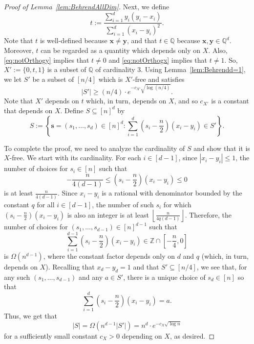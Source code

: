 \documentclass[12pt]{article}
\numberwithin{equation}{section}
\theoremstyle{definition}
\theoremstyle{remark}
\renewcommand{\vec}{\boldsymbol}
\begin{document}
\begin{proof}[Proof of Lemma~\ref{lem:BehrendAllDim}]
Next, we define
\[t:=\frac{\sum_{i=1}^dy_i(y_i-x_i)}{\sum_{i=1}^d(x_i-y_i)^2}.\]
Note that $t$ is well-defined because $\vec{x}\neq\vec{y}$, and that $t\in\mathbb{Q}$ because $\vec{x},\vec{y}\in\mathbb{Q}^d$. Moreover, $t$ can be regarded as a quantity which depends only on $X$. Also, \eqref{eq:notOrthogy} implies that $t\neq 0$ and \eqref{eq:notOrthogx} implies that $t\neq 1$. So, $X':=\{0,t,1\}$ is a subset of $\mathbb{Q}$ of cardinality 3. Using Lemma~\ref{lem:Behrendd=1}, we let $S'$ be a subset of $[n/4]$ which is $X'$-free and satisfies
\[|S'|\geq (n/4)\cdot e^{-c_{X'}\sqrt{\log(n/4)}}.\]
Note that $X'$ depends on $t$ which, in turn, depends on $X$, and so $c_{X'}$ is a constant that depends on $X$. Define $S\subseteq [n]^d$ by
\[S:=\left\{\vec{s}=(s_1,\dots,s_d)\in [n]^d:\sum_{i=1}^d \left(s_i-\frac{n}{2}\right)(x_i-y_i)\in S'\right\}.\]

To complete the proof, we need to analyze the cardinality of $S$ and show that it is $X$-free. We start with its cardinality. For each $i\in[d-1]$, since $|x_i-y_i|\leq 1$, the number of choices for $s_i\in [n]$ such that
\[-\frac{n}{4(d-1)}\leq \left(s_i-\frac{n}{2}\right)(x_i-y_i)\leq 0\]
is at least $\frac{n}{4(d-1)}$. Since $x_i-y_i$ is a rational with denominator bounded by the constant $q$ for all $i\in [d-1]$, the number of such $s_i$ for which $\left(s_i-\frac{n}{2}\right)(x_i-y_i)$ is also an integer is at least $\left\lfloor \frac{n}{4q(d-1)} \right\rfloor$. Therefore, the number of choices for $(s_1,\dots,s_{d-1})\in [n]^{d-1}$ such that 
\[\sum_{i=1}^{d-1}\left(s_i-\frac{n}{2}\right)(x_i-y_i)\in \mathbb{Z}\cap \left[ -\frac{n}{4}, 0 \right] \]
is $\Omega(n^{d-1})$, where the constant factor depends only on $d$ and $q$ (which, in turn, depends on $X$). Recalling that $x_d-y_d=1$ and that $S'\subseteq [n/4]$, we see that, for any such $(s_1,\dots,s_{d-1})$ and any $a\in S'$, there is a unique choice of $s_d\in [n]$ so that 
\[\sum_{i=1}^d \left(s_i-\frac{n}{2}\right)(x_i-y_i)=a.\]
Thus, we get that
\[|S|=\Omega(n^{d-1}|S'|) =n^d\cdot e^{-c_{X}\sqrt{\log{n}}}\]
for a sufficiently small constant $c_X>0$ depending on $X$, as desired. 


\end{proof}
\end{document}

